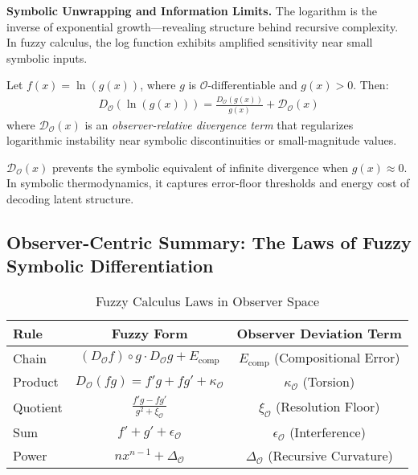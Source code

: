 \textbf{Symbolic Unwrapping and Information Limits.} The logarithm is the inverse of exponential growth---revealing structure behind recursive complexity. In fuzzy calculus, the log function exhibits amplified sensitivity near small symbolic inputs.

\begin{theorem}
\label{theorem:bk4_fuzzy_logarithmic_rule}
Let $f(x) = \ln(g(x))$, where $g$ is $\mathcal{O}$-differentiable and $g(x) > 0$. Then:
\begin{align}
D_{\mathcal{O}}(\ln(g(x))) = \frac{D_{\mathcal{O}}(g(x))}{g(x)} + \mathcal{D}_{\mathcal{O}}(x)
\end{align}
where $\mathcal{D}_{\mathcal{O}}(x)$ is an \emph{observer-relative divergence term} that regularizes logarithmic instability near symbolic discontinuities or small-magnitude values.
\end{theorem}

\begin{scholium}
\label{scholium:bk4_fuzzy_logarithmic_resolution}
$\mathcal{D}_{\mathcal{O}}(x)$ prevents the symbolic equivalent of infinite divergence when $g(x) \approx 0$. In symbolic thermodynamics, it captures error-floor thresholds and energy cost of decoding latent structure.
\end{scholium}


\subsection{Observer-Centric Summary: The Laws of Fuzzy Symbolic Differentiation}
\label{subsec:bk4_fuzzy_differentiation_summary}

\begin{table}[h!]
\centering
\begin{tabular}{|l|c|c|}
\hline
\textbf{Rule} & \textbf{Fuzzy Form} & \textbf{Observer Deviation Term} \\
\hline
Chain & $(D_{\mathcal{O}} f) \circ g \cdot D_{\mathcal{O}} g + E_{\text{comp}}$ & $E_{\text{comp}}$ (Compositional Error) \\
Product & $D_{\mathcal{O}}(fg) = f' g + f g' + \kappa_{\mathcal{O}}$ & $\kappa_{\mathcal{O}}$ (Torsion) \\
Quotient & $\frac{f'g - fg'}{g^2 + \xi_{\mathcal{O}}}$ & $\xi_{\mathcal{O}}$ (Resolution Floor) \\
Sum & $f' + g' + \epsilon_{\mathcal{O}}$ & $\epsilon_{\mathcal{O}}$ (Interference) \\
Power & $n x^{n-1} + \Delta_{\mathcal{O}}$ & $\Delta_{\mathcal{O}}$ (Recursive Curvature) \\
\hline
\end{tabular}
\caption{Fuzzy Calculus Laws in Observer Space}
\end{table}

